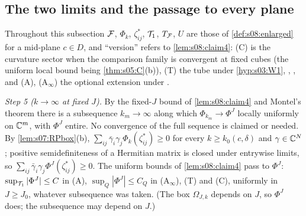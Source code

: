 \subsection{The two limits and the passage to every plane}

Throughout this subsection $\mathcal F$, $\Phi_k$, $\zeta^*_{ij}$, $\mathcal T_1$, $T_{\mathcal F}$, $U$ are those of \cref{def:s08:enlarged} for a mid-plane $c\in D$, and ``version'' refers to \cref{lem:s08:claim4}: (C) is the curvature sector when the comparison family is convergent at fixed cubes (the uniform local bound being \cref{thm:s05:C}(b)), (T) the tube under \cref{hyp:s03:W1}, \Itwo, \Ithree, and (A), (A$_\infty$) the optional extension under \Wtwo.

\emph{Step 5 ($k\to\infty$ at fixed $J$).} By the fixed-$J$ bound of \cref{lem:s08:claim4} and Montel's theorem there is a subsequence $k_m\to\infty$ along which $\Phi_{k_m}\to\Phi^J$ locally uniformly on $\mathbb C^m$, with $\Phi^J$ entire. No convergence of the full sequence is claimed or needed. By \cref{lem:s07:RPbox}(b), $\sum_{ij}\bar\gamma_i\gamma_j\Phi_k(\zeta^*_{ij})\ge0$ for every $k\ge k_0(c,\delta)$ and $\gamma\in\mathbb C^N$; positive semidefiniteness of a Hermitian matrix is closed under entrywise limits, so $\sum_{ij}\bar\gamma_i\gamma_j\Phi^J(\zeta^*_{ij})\ge0$. The uniform bounds of \cref{lem:s08:claim4} pass to $\Phi^J$: $\sup_{\mathcal T_1}|\Phi^J|\le C$ in (A), $\sup_Q|\Phi^J|\le C_Q$ in (A$_\infty$), (T) and (C), uniformly in $J\ge J_0$, whatever subsequence was taken. (The box $\Omega_{J,k}$ depends on $J$, so $\Phi^J$ does; the subsequence may depend on $J$.)

